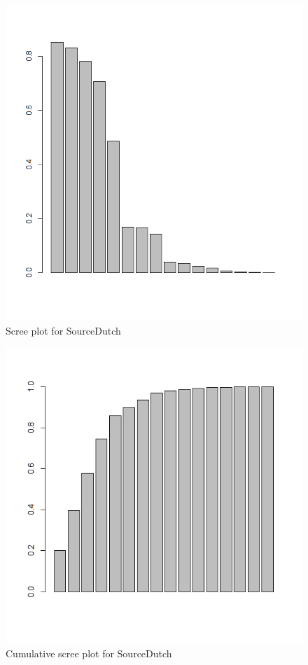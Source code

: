  
\begin{figure}
\includegraphics[height=.3\textheight]{figures/Vandevoorde2-img20.png}
\caption{\label{fig:key:20}  Scree plot for SourceDutch}
\end{figure}

\begin{figure}
\includegraphics[height=.3\textheight]{figures/Vandevoorde2-img21.png}
\caption{\label{fig:key:21}  Cumulative scree plot for SourceDutch}
\end{figure}

